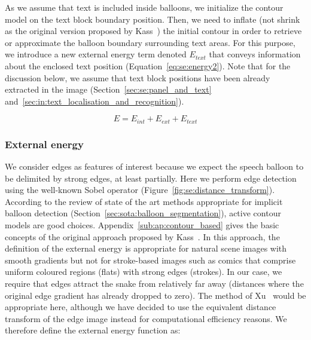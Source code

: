 As we assume that text is included inside balloons, we initialize the contour model on the text block boundary position.
Then, we need to inflate (not shrink as the original version proposed by Kass~\cite{Kass1988}) the initial contour in order to retrieve or approximate the balloon boundary surrounding text areas.
For this purpose, we introduce a new external energy term denoted $E_{text}$ that conveys information about the enclosed text position (Equation~\ref{eq:se:energy2}).
Note that for the discussion below, we assume that text block positions have been already extracted in the image (Section~\ref{sec:se:panel_and_text} and~\ref{sec:in:text_localisation_and_recognition}).%


\begin{equation}\label{eq:se:energy2}
  E = E_{int} + E_{ext} + E_{text}
\end{equation}


\subsubsection{External energy}
\label{sec:se:external_energie}

We consider edges as features of interest because we expect the speech balloon to be delimited by strong edges, at least partially.
Here we perform edge detection using the well-known Sobel operator (Figure~\ref{fig:se:distance_transform}).
According to the review of state of the art methods appropriate for implicit balloon detection (Section~\ref{sec:sota:balloon_segmentation}), active contour models are good choices.
Appendix~\ref{sub:ap:contour_based} gives the basic concepts of the original approach proposed by Kass~\cite{Kass1988}.
In this approach, the definition of the external energy is appropriate for natural scene images with smooth gradients but not for stroke-based images such as comics that comprise uniform coloured regions (flats) with strong edges (strokes).
In our case, we require that edges attract the snake from relatively far away (distances where the original edge gradient has already dropped to zero).
The method of Xu~\cite{Xu1998} would be appropriate here, although we have decided to use the equivalent distance transform of the edge image instead for computational efficiency reasons.
We therefore define the external energy function as:

